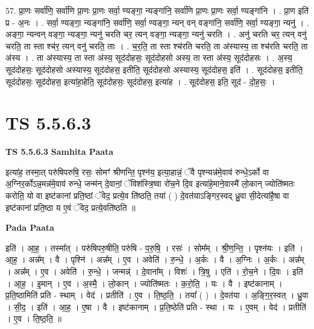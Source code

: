 \documentclass[17pt]{extarticle}
\begin{document}
57. प्रा॒णः सर्वा॑णि॒ सर्वा॑णि प्रा॒णः प्रा॒णः सर्वा॒ ण्यङ्गा॒ न्यङ्गा॑नि॒ सर्वा॑णि प्रा॒णः प्रा॒णः सर्वा॒
ण्यङ्गा॑नि । . प्रा॒ण इति॑ प्र - अ॒नः । . सर्वा॒ ण्यङ्गा॒ न्यङ्गा॑नि॒ सर्वा॑णि॒ सर्वा॒ ण्यङ्गा॒ न्यन् वन् वङ्गा॑नि॒ सर्वा॑णि॒ सर्वा॒ ण्यङ्गा॒ न्यनु॑ । . अङ्गा॒ न्यन्वन् वङ्गा॒ न्यङ्गा॒ न्यनु॑ चरति चर॒ त्यन् वङ्गा॒ न्यङ्गा॒ न्यनु॑ चरति । . अनु॑ चरति चर॒ त्यन् वनु॑ चरति॒ ता स्ता श्च॑र॒ त्यन् वनु॑ चरति॒ ताः । . च॒र॒ति॒ ता स्ता श्च॑रति चरति॒ ता अ॑स्यास्य॒ ता श्च॑रति चरति॒ ता अ॑स्य । . ता अ॑स्यास्य॒ ता स्ता अ॑स्य॒ सूद॑दोहसः॒ सूद॑दोहसो अस्य॒ ता स्ता अ॑स्य॒ सूद॑दोहसः । . अ॒स्य॒ सूद॑दोहसः॒ सूद॑दोहसो अस्यास्य॒ सूद॑दोहस॒ इतीति॒ सूद॑दोहसो अस्यास्य॒ सूद॑दोहस॒ इति॑ । . सूद॑दोहस॒ इतीति॒ सूद॑दोहसः॒ सूद॑दोहस॒ इत्या॑हा॒हेति॒ सूद॑दोहसः॒ सूद॑दोहस॒ इत्या॑ह । . सूद॑दोहस॒ इति॒ सूद॑ - दो॒ह॒सः॒ । \newline
\pagebreak
{}

\section{ TS 5.5.6.3 }

\textbf{TS 5.5.6.3 } \newline
\textbf{Samhita Paata} \newline

इत्या॑ह॒ तस्मा॒त् परु॑षिपरुषि॒ रसः॒ सोमꣳ॑ श्रीणन्ति॒ पृश्न॑य॒ इत्या॒हान्नं॒ ॅवै पृश्न्यन्न॑मे॒वाव॑ रुन्धे॒ऽर्को वा अ॒ग्निर॒र्कोऽन्न॒मन्न॑मे॒वाव॑ रुन्धे॒ जन्म॑न् दे॒वानां॒ ॅविश॑स्त्रि॒ष्वा रो॑च॒ने दि॒व इत्या॑हे॒माने॒वास्मै॑ लो॒कान् ज्योति॑ष्मतः करोति॒ यो वा इष्ट॑कानां प्रति॒ष्ठां ॅवेद॒ प्रत्ये॒व ति॑ष्ठति॒ तया॑ ( ) दे॒वत॑याऽङ्गिर॒स्वद् ध्रु॒वा सी॒देत्या॑है॒षा वा इष्ट॑कानां प्रति॒ष्ठा य ए॒वं ॅवेद॒ प्रत्ये॒वति॑ष्ठति ॥ \newline

\textbf{Pada Paata} \newline

इति॑ । आ॒ह॒ । तस्मा᳚त् । परु॑षिपरु॒षीति॒ परु॑षि - प॒रु॒षि॒ । रसः॑ । सोम᳚म् । श्री॒ण॒न्ति॒ । पृश्न॑यः । इति॑ । आ॒ह॒ । अन्न᳚म् । वै । पृश्नि॑ । अन्न᳚म् । ए॒व । अवेति॑ । रु॒न्धे॒ । अ॒र्कः । वै । अ॒ग्निः । अ॒र्कः । अन्न᳚म् । अन्न᳚म् । ए॒व । अवेति॑ । रु॒न्धे॒ । जन्मन्न्॑ । दे॒वाना᳚म् । विशः॑ । त्रि॒षु । एति॑ । रो॒च॒ने । दि॒वः । इति॑ । आ॒ह॒ । इ॒मान् । ए॒व । अ॒स्मै॒ । लो॒कान् । ज्योति॑ष्मतः । क॒रो॒ति॒ । यः । वै । इष्ट॑कानाम् । प्र॒ति॒ष्ठामिति॑ प्रति - स्थाम् । वेद॑ । प्रतीति॑ । ए॒व । ति॒ष्ठ॒ति॒ । तया᳚ ( ) । दे॒वत॑या । अ॒ङ्गि॒र॒स्वत् । ध्रु॒वा । सी॒द॒ । इति॑ । आ॒ह॒ । ए॒षा । वै । इष्ट॑कानाम् । प्र॒ति॒ष्ठेति॑ प्रति - स्था । यः । ए॒वम् । वेद॑ । प्रतीति॑ । ए॒व । ति॒ष्ठ॒ति॒ ॥  \newline
\end{document}
